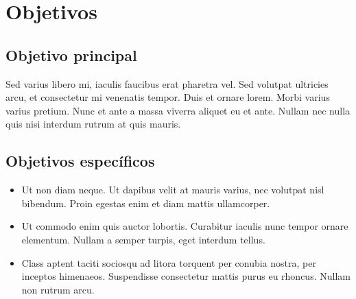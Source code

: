 \section{Objetivos}
%
\subsection{Objetivo principal}
%
Sed varius libero mi, iaculis faucibus erat pharetra vel. Sed volutpat ultricies arcu, et consectetur mi venenatis tempor. Duis et ornare lorem. Morbi varius varius pretium. Nunc et ante a massa viverra aliquet eu et ante. Nullam nec nulla quis nisi interdum rutrum at quis mauris. 
%
\subsection{Objetivos espec\'ificos}
\begin{itemize}
\item Ut non diam neque. Ut dapibus velit at mauris varius, nec volutpat nisl bibendum. Proin egestas enim et diam mattis ullamcorper.
%
\item Ut commodo enim quis auctor lobortis. Curabitur iaculis nunc tempor ornare elementum. Nullam a semper turpis, eget interdum tellus.
%
\item Class aptent taciti sociosqu ad litora torquent per conubia nostra, per inceptos himenaeos. Suspendisse consectetur mattis purus eu rhoncus. Nullam non rutrum arcu.
\end{itemize}
